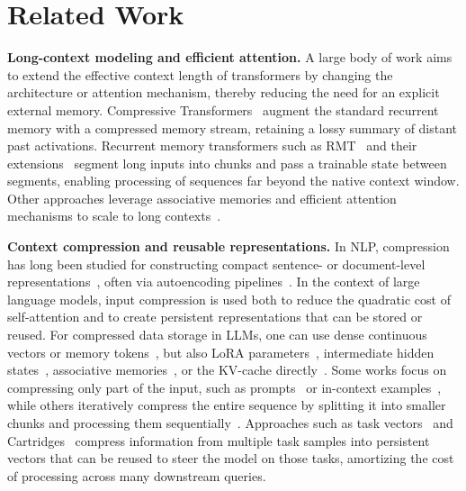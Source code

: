 \documentclass{article}
\theoremstyle{plain}
\theoremstyle{definition}
\theoremstyle{remark}
\begin{document}
{\section{Related Work}
\label{sec:related}

\textbf{Long-context modeling and efficient attention.}
A large body of work aims to extend the effective context length of transformers by changing the architecture or attention mechanism, thereby reducing the need for an explicit external memory.
Compressive Transformers~\citep{rae2019compressive} augment the standard recurrent memory with a compressed memory stream, retaining a lossy summary of distant past activations.
Recurrent memory transformers such as RMT~\citep{rmt_2022} and their extensions~\citep{chevalier2023adapting} segment long inputs into chunks and pass a trainable state between segments, enabling processing of sequences far beyond the native context window.
Other approaches leverage associative memories and efficient attention mechanisms to scale to long contexts~\citep{rodkin2024associative, ramsauer2020hopfield}.

\textbf{Context compression and reusable representations.}
In NLP, compression has long been studied for constructing compact sentence- or document-level representations~\citep{le2014distributed, kiros2015skip, cer2018USE}, often via autoencoding pipelines~\citep{bowman-etal-2016-generating, pmlr-v48-miao16}.
In the context of large language models, input compression is used both to reduce the quadratic cost of self-attention and to create persistent representations that can be stored or reused.
For compressed data storage in LLMs, one can use dense continuous vectors or memory tokens~\citep{burtsev2021memory}, but also LoRA parameters~\citep{hu2022lora}, intermediate hidden states~\citep{li2024500xcompressor}, associative memories~\citep{rodkin2024associative, ramsauer2020hopfield}, or the KV-cache directly~\citep{chari2025kv, karamitrellis}.
Some works focus on compressing only part of the input, such as prompts~\citep{lester2021power, li2021prefix} or in-context examples~\citep{ge2023incontext, eyuboglu2025cartridges}, while others iteratively compress the entire sequence by splitting it into smaller chunks and processing them sequentially~\citep{rae2019compressive, rmt_2022, chevalier2023adapting, prakash2025attention}.
Approaches such as task vectors~\citep{ilharco2022editing} and Cartridges~\citep{eyuboglu2025cartridges} compress information from multiple task samples into persistent vectors that can be reused to steer the model on those tasks, amortizing the cost of processing across many downstream queries.

}
\end{document}
